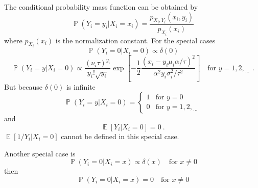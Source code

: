 \documentclass[12pt]{report}
\DeclareMathOperator{\expectation}{\mathbb{E}}
\DeclareMathOperator{\prob}{\mathbb{P}}
\newcommand{\dotdotdot}{_{\phantom{.}\cdots}}
\begin{document}
The conditional probability mass function can be obtained by
\begin{equation*}
\prob\left(Y_i=y_i|X_i=x_i\right)=\frac{p_{X_i,Y_i}\left(x_i,y_i\right)}{p_{X_i}(x_i)}
\end{equation*}
where $p_{X_i}(x_i)$ is the normalization constant.
For the special cases
\begin{equation*}
\prob\left(Y_i=0|X_i=0\right) \propto \delta(0)
\end{equation*}
\begin{equation*}
\prob\left(Y_i=y|X_i=0\right) \propto
\dfrac{(\nu_i\tau)^{y_i}}{y_i!\sqrt{y_i}}
\exp\left[-\dfrac{1}{2}\dfrac{\left(x_i-y_i\mu_i\alpha/\tau\right)^2}{\alpha^2y_i\sigma_i^2/\tau^2}\right]
\quad \text{for }y=1,2,\dotdotdot \ .
\end{equation*}
But because $\delta(0)$ is infinite
\begin{equation}
\prob\left(Y_i=y|X_i=0\right) =
\begin{cases}
1 & \text{for }y=0
\\
0 & \text{for }y=1,2,\dotdotdot
\end{cases}
\end{equation}
and
\begin{equation}
\expectation[Y_i|X_i=0] = 0 \ .
\end{equation}
$\expectation[1/Y_i|X_i=0]$ cannot be defined in this special case.

Another special case is
\begin{equation*}
\prob\left(Y_i=0|X_i=x\right) \propto \delta(x) \quad \text{for }x\neq0
\end{equation*}
then
\begin{equation}
\prob\left(Y_i=0|X_i=x\right) = 0 \quad \text{for }x\neq0
\end{equation}
\end{document}
